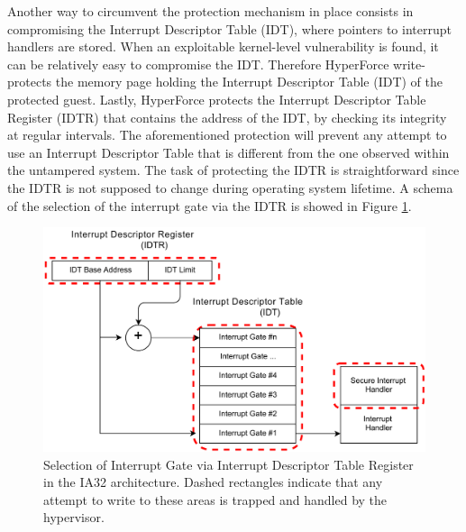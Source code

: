 Another way to circumvent the protection mechanism in place consists in compromising the Interrupt Descriptor Table (IDT), where pointers to interrupt handlers are stored. When an exploitable kernel-level vulnerability is found, it can be relatively easy to compromise the IDT. 
Therefore HyperForce write-protects the memory page holding the Interrupt Descriptor Table (IDT) of the protected guest. Lastly, HyperForce protects the Interrupt Descriptor Table Register (IDTR) that contains the address of the IDT, by checking its integrity at regular intervals. The aforementioned protection will prevent any attempt to use an Interrupt Descriptor Table that is different from the one observed within the untampered system.
The task of protecting the IDTR is straightforward since the IDTR is not supposed to change during operating system lifetime. A schema of the selection of the interrupt gate via the IDTR is showed in Figure \ref{idtr}.



\begin{figure}
\begin{center}
\includegraphics[scale=0.5]{images/IDTR.pdf}
\caption{Selection of Interrupt Gate via Interrupt Descriptor Table Register in the IA32 architecture. Dashed rectangles indicate that any attempt to write to these areas is trapped and handled by the hypervisor.}
\label{idtr}
\end{center}
\end{figure}


